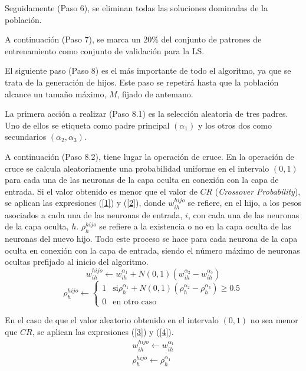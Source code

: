 Seguidamente (Paso 6), se eliminan todas las soluciones dominadas de la población.

A continuación (Paso 7), se marca un 20\% del conjunto de patrones de entrenamiento como
conjunto de validación para la LS.

El siguiente paso (Paso 8) es el más importante de todo el algoritmo, ya que se trata de
la generación de hijos. Este paso se repetirá hasta que la población alcance un tamaño
máximo, $M$, fijado de antemano.

La primera acción a realizar (Paso 8.1) es la selección aleatoria de tres
padres. Uno de ellos se etiqueta como padre principal $(\alpha_{1})$ y los otros dos
como secundarios $(\alpha_{2},\alpha_{3})$.

A continuación (Paso 8.2), tiene lugar la operación de cruce. En la operación de cruce se
calcula aleatoriamente una probabilidad uniforme en el intervalo $(0,1)$ para cada una de
las
neuronas de la capa oculta en conexión con la capa de entrada. Si el valor obtenido es menor que el
valor de $CR$ (\textit{Crossover Probability}), se aplican las expresiones (\ref{1}) y
(\ref{2}), donde  $w_{ih}^{hijo}$ se refiere, en el hijo, a los pesos asociados a cada una de las
neuronas de entrada, $i$, con cada una de las neuronas de la capa oculta, $h$. $\rho_{h}^{hijo}$ se
refiere a la existencia o no en la capa oculta de las neuronas del nuevo hijo. Todo este
proceso se hace para cada neurona de la capa oculta en conexión con la capa de entrada, siendo el
número máximo de neuronas ocultas prefijado al inicio del algoritmo.
\begin{equation}\label{1}
w_{ih}^{hijo} \leftarrow w_{ih}^{\alpha_{1}} +
N(0,1)(w_{ih}^{\alpha_{2}}-w_{ih}^{\alpha_{3}})
\end{equation}
\begin{equation}\label{2}
 \rho_{h}^{hijo} \leftarrow \left\lbrace
 \begin{array}{ll}
 1 & \mbox{si
$\rho_{h}^{\alpha_{1}}+N(0,1)(\rho_{h}^{\alpha_{2}}-\rho_{h}^{\alpha_{3}})\geq 0.5$} \\
 0 & \mbox{en otro caso}
 \end{array}
 \right.
\end{equation}

En el caso de que el valor aleatorio obtenido en el intervalo $(0,1)$ no sea menor que $CR$, se
aplican las expresiones (\ref{3}) y (\ref{4}).
\begin{eqnarray}
w_{ih}^{hijo} \leftarrow w_{ih}^{\alpha_{1}} \label{3} \\
\rho_{h}^{hijo} \leftarrow \rho_{h}^{\alpha_{1}} \label{4}
\end{eqnarray}

